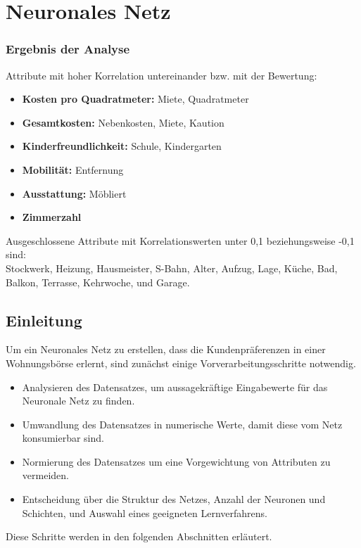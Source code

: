 \section{Neuronales Netz}\label{sec:nn}



\subsubsection{Ergebnis der Analyse}
Attribute mit hoher Korrelation untereinander bzw. mit der Bewertung:
\begin{itemize}
    \item \textbf{Kosten pro Quadratmeter:} Miete, Quadratmeter
    \item \textbf{Gesamtkosten:} Nebenkosten, Miete, Kaution
    \item \textbf{Kinderfreundlichkeit:} Schule, Kindergarten
    \item \textbf{Mobilität:} Entfernung
    \item \textbf{Ausstattung:} Möbliert
    \item \textbf{Zimmerzahl}
\end{itemize}

Ausgeschlossene Attribute mit Korrelationswerten unter 0,1 beziehungsweise -0,1 sind:\\
Stockwerk, Heizung, Hausmeister, S-Bahn, Alter, Aufzug, Lage, Küche, Bad, Balkon, Terrasse, Kehrwoche, 
und Garage.


\subsection{Einleitung}
Um ein Neuronales Netz zu erstellen, dass die Kundenpräferenzen in einer Wohnungsbörse erlernt,
sind zunächst einige Vorverarbeitungsschritte notwendig.
\begin{itemize}
    \item Analysieren des Datensatzes, um aussagekräftige Eingabewerte für das Neuronale Netz zu
            finden.
    \item Umwandlung des Datensatzes in numerische Werte, damit diese vom Netz konsumierbar sind.
    \item Normierung des Datensatzes um eine Vorgewichtung von Attributen zu vermeiden.
    \item Entscheidung über die Struktur des Netzes, Anzahl der Neuronen und Schichten, und Auswahl 
            eines geeigneten Lernverfahrens.
\end{itemize}
Diese Schritte werden in den folgenden Abschnitten erläutert. 

